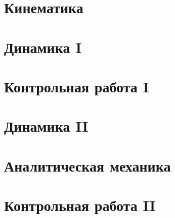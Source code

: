 




% 
% 

\newpage

\section{Кинематика}






\section{Динамика I}
\setcounter{subsection}{4}




\section{Контрольная работа I}




\section{Динамика II}
\setcounter{subsection}{7}

\section{Аналитическая механика}
\setcounter{subsection}{9}


\section{Контрольная работа II}


